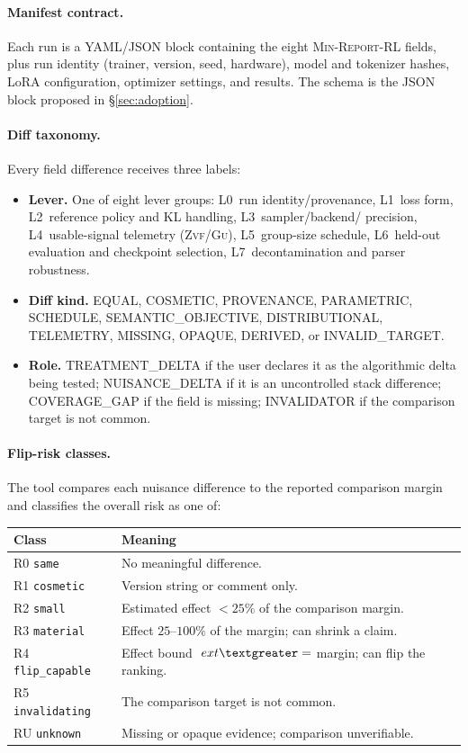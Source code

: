 \documentclass[11pt]{article}
\newcommand{\zvf}{\textsc{Zvf}}
\newcommand{\gu}{\textsc{Gu}}
\newcommand{\minreport}{\textsc{Min-Report-RL}}
\begin{document}
\paragraph{Manifest contract.} Each run is a YAML/JSON block containing the
eight \minreport{} fields, plus run identity (trainer, version, seed, hardware),
model and tokenizer hashes, LoRA configuration, optimizer settings, and results.
The schema is the JSON block proposed in \S\ref{sec:adoption}.

\paragraph{Diff taxonomy.} Every field difference receives three labels:
\begin{itemize}[leftmargin=1.4em, itemsep=2pt]
  \item \textbf{Lever.} One of eight lever groups: L0~run identity/provenance,
    L1~loss form, L2~reference policy and KL handling, L3~sampler/backend/
    precision, L4~usable-signal telemetry (\zvf/\gu{}), L5~group-size
    schedule, L6~held-out evaluation and checkpoint selection, L7~decontamination
    and parser robustness.
  \item \textbf{Diff kind.} EQUAL, COSMETIC, PROVENANCE, PARAMETRIC, SCHEDULE,
    SEMANTIC\_OBJECTIVE, DISTRIBUTIONAL, TELEMETRY, MISSING, OPAQUE, DERIVED, or
    INVALID\_TARGET.
  \item \textbf{Role.} TREATMENT\_DELTA if the user declares it as the
    algorithmic delta being tested; NUISANCE\_DELTA if it is an uncontrolled
    stack difference; COVERAGE\_GAP if the field is missing; INVALIDATOR if the
    comparison target is not common.
\end{itemize}

\paragraph{Flip-risk classes.} The tool compares each nuisance difference to
the reported comparison margin and classifies the overall risk as one of:
\begin{center}
\small
\begin{tabular}{@{}ll@{}}
\toprule
\textbf{Class} & \textbf{Meaning}\\
\midrule
R0 \texttt{same} & No meaningful difference.\\
R1 \texttt{cosmetic} & Version string or comment only.\\
R2 \texttt{small} & Estimated effect $<25\%$ of the comparison margin.\\
R3 \texttt{material} & Effect $25$--$100\%$ of the margin; can shrink a claim.\\
R4 \texttt{flip\_capable} & Effect bound $\	ext{\textgreater=}$ margin; can flip the ranking.\\
R5 \texttt{invalidating} & The comparison target is not common.\\
RU \texttt{unknown} & Missing or opaque evidence; comparison unverifiable.\\
\bottomrule
\end{tabular}
\end{center}
\end{document}
